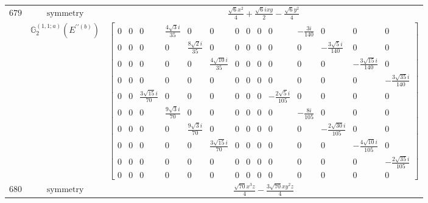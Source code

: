 \documentclass[fleqn,8pt,landscape]{jsarticle}
\begin{document}
\begin{longtable}{ccc}
$ 679 $ & $ \text{symmetry} $ & $ \frac{\sqrt{6} x^{2}}{4} + \frac{\sqrt{6} i x y}{2} - \frac{\sqrt{6} y^{2}}{4} $ \\
$  $ & $ \mathbb{G}_{2}^{(1,1;a)}(E^{\prime\prime(b)}) $ & $ \begin{bmatrix} 0 & 0 & 0 & \frac{4 \sqrt{3} i}{35} & 0 & 0 & 0 & 0 & 0 & 0 & - \frac{3 i}{140} & 0 & 0 & 0 \\ 0 & 0 & 0 & 0 & \frac{8 \sqrt{2} i}{35} & 0 & 0 & 0 & 0 & 0 & 0 & - \frac{3 \sqrt{5} i}{140} & 0 & 0 \\ 0 & 0 & 0 & 0 & 0 & \frac{4 \sqrt{10} i}{35} & 0 & 0 & 0 & 0 & 0 & 0 & - \frac{3 \sqrt{15} i}{140} & 0 \\ 0 & 0 & 0 & 0 & 0 & 0 & 0 & 0 & 0 & 0 & 0 & 0 & 0 & - \frac{3 \sqrt{35} i}{140} \\ 0 & 0 & \frac{3 \sqrt{15} i}{70} & 0 & 0 & 0 & 0 & 0 & 0 & - \frac{2 \sqrt{5} i}{105} & 0 & 0 & 0 & 0 \\ 0 & 0 & 0 & \frac{9 \sqrt{3} i}{70} & 0 & 0 & 0 & 0 & 0 & 0 & - \frac{8 i}{105} & 0 & 0 & 0 \\ 0 & 0 & 0 & 0 & \frac{9 \sqrt{3} i}{70} & 0 & 0 & 0 & 0 & 0 & 0 & - \frac{2 \sqrt{30} i}{105} & 0 & 0 \\ 0 & 0 & 0 & 0 & 0 & \frac{3 \sqrt{15} i}{70} & 0 & 0 & 0 & 0 & 0 & 0 & - \frac{4 \sqrt{10} i}{105} & 0 \\ 0 & 0 & 0 & 0 & 0 & 0 & 0 & 0 & 0 & 0 & 0 & 0 & 0 & - \frac{2 \sqrt{35} i}{105} \\ 0 & 0 & 0 & 0 & 0 & 0 & 0 & 0 & 0 & 0 & 0 & 0 & 0 & 0 \end{bmatrix} $ \\ \hline
$ 680 $ & $ \text{symmetry} $ & $ \frac{\sqrt{70} x^{3} z}{4} - \frac{3 \sqrt{70} x y^{2} z}{4} $ \\

\end{longtable}
\end{document}
